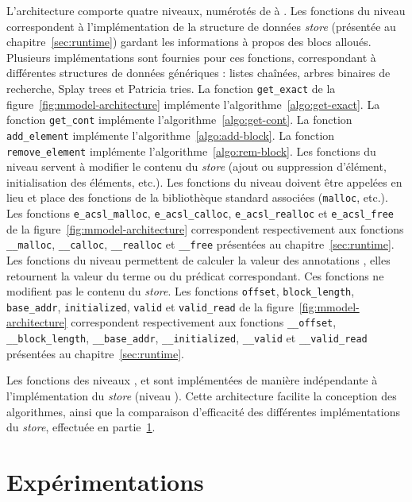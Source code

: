 L'architecture comporte quatre niveaux, numérotés de  à .
Les fonctions du niveau  correspondent à l'implémentation de la
structure de données {\em store} (présentée au chapitre~\ref{sec:runtime})
gardant les informations à propos des blocs alloués.
Plusieurs implémentations sont fournies pour ces fonctions, correspondant à
différentes structures de données génériques : listes chaînées, arbres binaires
de recherche, Splay trees et Patricia tries.
La fonction \lstinline'get_exact' de la figure~\ref{fig:mmodel-architecture}
implémente l'algorithme~\ref{algo:get-exact}.
La fonction \lstinline'get_cont' implémente l'algorithme~\ref{algo:get-cont}.
La fonction \lstinline'add_element' implémente
l'algorithme~\ref{algo:add-block}.
La fonction \lstinline'remove_element' implémente
l'algorithme~\ref{algo:rem-block}.
Les fonctions du niveau  servent à modifier le contenu du {\em store}
(ajout ou suppression d'élément, initialisation des éléments, etc.).
Les fonctions du niveau  doivent être appelées en lieu et place des
fonctions de la bibliothèque standard associées (\lstinline'malloc', etc.).
Les fonctions \lstinline'e_acsl_malloc', \lstinline'e_acsl_calloc',
\lstinline'e_acsl_realloc' et \lstinline'e_acsl_free' de la
figure~\ref{fig:mmodel-architecture} correspondent respectivement aux fonctions
\lstinline'__malloc', \lstinline'__calloc',
\lstinline'__realloc' et \lstinline'__free' présentées au
chapitre~\ref{sec:runtime}.
Les fonctions du niveau  permettent de calculer la valeur des
annotations \eacsl, elles retournent la valeur du terme ou du prédicat \eacsl
correspondant.
Ces fonctions ne modifient pas le contenu du {\em store}.
Les fonctions \lstinline'offset', \lstinline'block_length',
\lstinline'base_addr', \lstinline'initialized', \lstinline'valid' et
\lstinline'valid_read' de la figure~\ref{fig:mmodel-architecture} correspondent
respectivement aux fonctions \lstinline'__offset', \lstinline'__block_length',
\lstinline'__base_addr', \lstinline'__initialized', \lstinline'__valid' et
\lstinline'__valid_read' présentées au chapitre~\ref{sec:runtime}.

Les fonctions des niveaux ,  et  sont
implémentées de manière indépendante à l'implémentation du {\em store} (niveau
).
Cette architecture facilite la conception des algorithmes, ainsi que la
comparaison d'efficacité des différentes implémentations du {\em store},
effectuée en partie~\ref{sec:eacsl-exp}.


\section{Expérimentations}
\label{sec:eacsl-exp}



